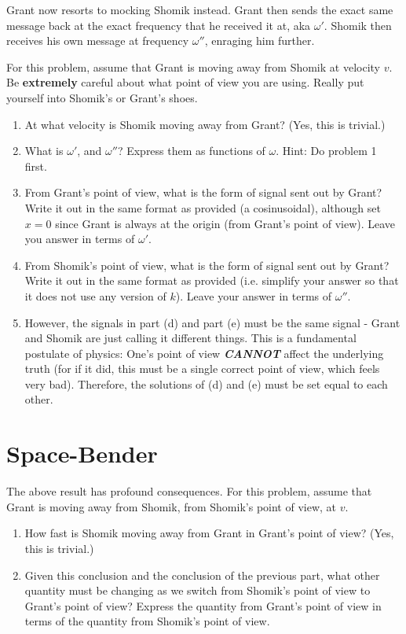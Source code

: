 \documentclass{article}
\begin{document}
Grant now resorts to mocking Shomik instead. Grant then sends the exact same message back at the exact frequency that he received it at, aka $\omega'$. Shomik then receives his own message at frequency $\omega''$, enraging him further.

For this problem, assume that Grant is moving away from Shomik at velocity $v$. Be \textbf{extremely} careful about what point of view you are using. Really put yourself into Shomik's or Grant's shoes.

\begin{enumerate}[label=(\alph*)]
    \item At what velocity is Shomik moving away from Grant? (Yes, this is trivial.)
    
    \item What is $\omega'$, and $\omega''$? Express them as functions of $\omega$. Hint: Do problem 1 first.

    \item From Grant's point of view, what is the form of signal sent out by Grant? Write it out in the same format as provided (a cosinusoidal), although set $x = 0$ since Grant is always at the origin (from Grant's point of view). Leave you answer in terms of $\omega'$.

    \item From Shomik's point of view, what is the form of signal sent out by Grant? Write it out in the same format as provided (i.e. simplify your answer so that it does not use any version of $k$). Leave your answer in terms of $\omega''$.

    \item However, the signals in part (d) and part (e) must be the same signal - Grant and Shomik are just calling it different things. This is a fundamental postulate of physics: One's point of view \textbf{\textit{CANNOT}} affect the underlying truth (for if it did, this must be a single correct point of view, which feels very bad). Therefore, the solutions of (d) and (e) must be set equal to each other.
\end{enumerate}

\section{Space-Bender}

The above result has profound consequences. For this problem, assume that Grant is moving away from Shomik, from Shomik's point of view, at $v$.

\begin{enumerate}[label=(\alph*)]
    \item How fast is Shomik moving away from Grant in Grant's point of view? (Yes, this is trivial.)
    
    \item Given this conclusion and the conclusion of the previous part, what other quantity must be changing as we switch from Shomik's point of view to Grant's point of view? Express the quantity from Grant's point of view in terms of the quantity from Shomik's point of view.
\end{enumerate}
\end{document}
